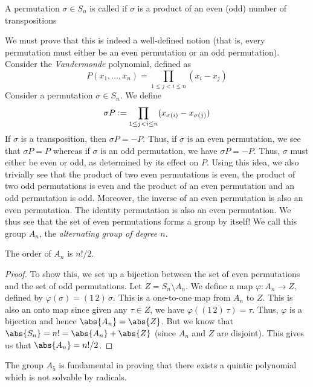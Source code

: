 \begin{defn}
    A permutation $\sigma \in S_n$ is called  if $\sigma$ is a product of an even (odd) number of transpositions
\end{defn}

We must prove that this is indeed a well-defined notion (that is, every permutation must either be an even permutation or an odd permutation). Consider the \emph{Vandermonde} polynomial, defined as
\[
    P(x_1, \ldots, x_n) = \prod_{1 \leq j < i \leq n} (x_i - x_j)
\]
Consider a permutation $\sigma \in S_n$. We define
\[
    \sigma P \vcentcolon= \prod_{1 \leq j < i \leq n} (x_{\sigma(i)} - x_{\sigma(j)})
\]
If $\sigma$ is a transposition, then $\sigma P = -P$. Thus, if $\sigma$ is an even permutation, we see that $\sigma P = P$ whereas if $\sigma$ is an odd permutation, we have $\sigma P = -P$. Thus, $\sigma$ must either be even or odd, as determined by its effect on $P$. Using this idea, we also trivially see that the product of two even permutations is even, the product of two odd permutations is even and the product of an even permutation and an odd permutation is odd. Moreover, the inverse of an even permutation is also an even permutation. The identity permutation is also an even permutation. We thus see that the set of even permutations forms a group by itself! We call this group $A_n$, the \emph{alternating group of degree $n$}. 

\begin{prop} \label{prop:order-of-An}
    The order of $A_n$ is $n!/2$.\footnotemark
\end{prop} 
\begin{proof}
    To show this, we set up a bijection between the set of even permutations and the set of odd permutations. Let $Z = S_n \setminus A_n$. We define a map $\varphi \colon A_n \to Z$, defined by $\varphi(\sigma) = (1 \, 2) \, \sigma$. This is a one-to-one map from $A_n$ to $Z$. This is also an onto map since given any $\tau \in Z$, we have $\varphi\left((1 \, 2) \, \tau\right) = \tau$. Thus, $\varphi$ is a bijection and hence $\abs{A_n} = \abs{Z}$. But we know that $\abs{S_n} = n! = \abs{A_n} + \abs{Z}$ (since $A_n$ and $Z$ are disjoint). This gives us that $\abs{A_n} = n!/2$.
\end{proof}

\begin{rem}
    The group $A_5$ is fundamental in proving that there exists a quintic polynomial which is not solvable by radicals.
\end{rem}

